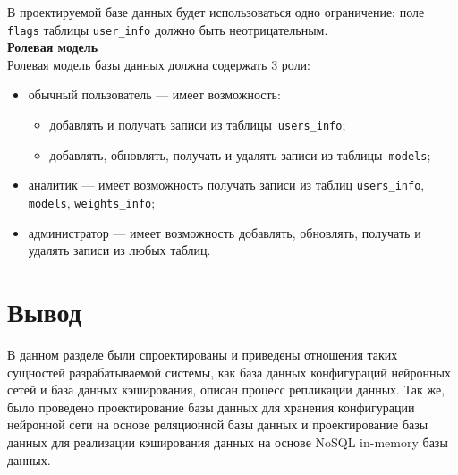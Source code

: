В проектируемой базе данных будет использоваться одно ограничение: поле \texttt{flags} таблицы \texttt{user\_info} должно быть неотрицательным.\\

\noindent\textbf{Ролевая модель}\\

Ролевая модель базы данных должна содержать 3 роли:
\begin{itemize}
	\item обычный пользователь --- имеет возможность:
		\begin{itemize}
			\item добавлять и получать записи из таблицы~\texttt{users\_info};
			\item добавлять, обновлять, получать и удалять записи из таблицы~\texttt{models};
		\end{itemize}
	\item аналитик --- имеет возможность получать записи из таблиц \texttt{users\_info}, \texttt{models}, \texttt{weights\_info};
	\item администратор --- имеет возможность добавлять, обновлять, получать и удалять записи из любых таблиц.
\end{itemize}

\section*{Вывод}

В данном разделе были спроектированы и приведены отношения таких сущностей разрабатываемой системы, как база данных конфигураций нейронных сетей и база данных кэширования, описан процесс репликации данных. Так же, было проведено проектирование базы данных для хранения конфигурации нейронной сети на основе реляционной базы данных и проектирование базы данных для реализации кэширования данных на основе NoSQL in-memory базы данных.